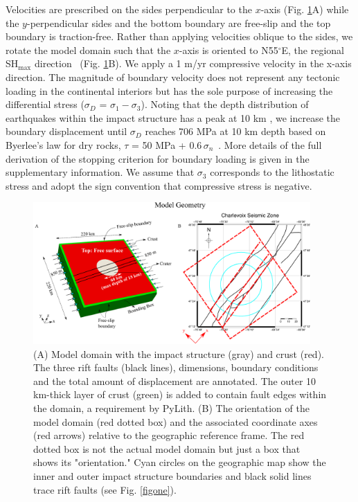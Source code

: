 \documentclass[draft]{agujournal2018}
\begin{document}
Velocities are prescribed on the sides perpendicular to the $x$-axis (Fig. \ref{figtwo}A) while the $y$-perpendicular sides and the bottom boundary are free-slip and the top boundary is traction-free. Rather than applying velocities oblique to the sides, we rotate the model domain such that the $x$-axis is oriented to N55$^\circ$E, the regional SH$_{\max}$ direction~\citep{Zoback_1992} (Fig. \ref{figtwo}B). We apply a 1 m/yr compressive velocity in the x-axis direction. The magnitude of boundary velocity does not represent any tectonic loading in the continental interiors but has the sole purpose of increasing the differential stress ($\sigma_D$ = $\sigma_1 - \sigma_3$). Noting that the depth distribution of earthquakes within the impact structure has a peak at 10 km \citep{Baird_2010,Powell_2017}, we increase the boundary displacement until $\sigma_D$ reaches 706 MPa at 10 km depth based on Byerlee's law for dry rocks, $\tau$  = 50 MPa + 0.6$\,\sigma_n$~\citep{Byerlee_1978}. More details of the full derivation of the stopping criterion for boundary loading is given in the supplementary information. We assume that $\sigma_3$ corresponds to the lithostatic stress and adopt the sign convention that compressive stress is negative.

\begin{figure}[ht]
\centering
\includegraphics[width=25pc]{Figures/model_geometry.png}
\caption{(A) Model domain with the impact structure (gray) and crust (red). The three rift faults (black lines), dimensions, boundary conditions and the total amount of displacement are annotated. The outer 10 km-thick layer of crust (green) is added to contain fault edges within the domain, a requirement by PyLith. (B) The orientation of the model domain (red dotted box) and the associated coordinate axes (red arrows) relative to the geographic reference frame. The red dotted box is not the actual model domain but just a box that shows its "orientation." Cyan circles on the geographic map show the inner and outer impact structure boundaries and black solid lines trace rift faults (see Fig. \ref{figone}).}
\label{figtwo}
\end{figure}
\end{document}
